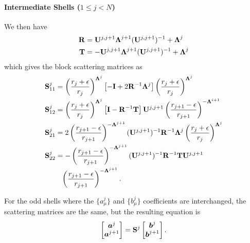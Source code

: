 \paragraph{Intermediate Shells  ($1\leq j < N$)}
We then have
  \begin{subequations}
  \begin{align}
   \mathbf{R}	&= \mathbf{U}^{j,j+1}\boldsymbol{\Lambda}^{j+1}(\mathbf{U}^{j,j+1})^{-1}+\boldsymbol{\Lambda}^j	\\
   \mathbf{T}	&= -\mathbf{U}^{j,j+1}\boldsymbol{\Lambda}^{j+1}(\mathbf{U}^{j,j+1})^{-1}+\boldsymbol{\Lambda}^j
  \end{align}
  \end{subequations}
which gives the block scattering matrices as
  \begin{subequations}
  \begin{align}
   \mathbf{S}^j_{11}	&= \left(\frac{r_j+\epsilon}{r_j}\right)^{\boldsymbol{\Lambda}^j}\left[-\mathbf{I}+2\mathbf{R}^{-1}\boldsymbol{\Lambda}^j\right]\left(\frac{r_j+\epsilon}{r_j}\right)^{\boldsymbol{\Lambda}^j}	\\
   \mathbf{S}^j_{12}	&= \left(\frac{r_j+\epsilon}{r_j}\right)^{\boldsymbol{\Lambda}^j}\left[\mathbf{I}-\mathbf{R}^{-1}\mathbf{T}\right]\mathbf{U}^{j,j+1}\left(\frac{r_{j+1}-\epsilon}{r_{j+1}}\right)^{-\boldsymbol{\Lambda}^{i+1}}	\\
   \mathbf{S}^j_{21}	&= 2\left(\frac{r_{j+1}-\epsilon}{r_{j+1}}\right)^{-\boldsymbol{\Lambda}^{j+1}}(\mathbf{U}^{j,j+1})^{-1}\mathbf{R}^{-1}\boldsymbol{\Lambda}^j\left(\frac{r_j+\epsilon}{r_j}\right)^{\boldsymbol{\Lambda}^j}	\\
   \mathbf{S}^j_{22}	&= -\left(\frac{r_{j+1}-\epsilon}{r_{j+1}}\right)^{-\boldsymbol{\Lambda}^{j+1}}(\mathbf{U}^{j,j+1})^{-1}\mathbf{R}^{-1}\mathbf{T}\mathbf{U}^{j,j+1}\nonumber\\
			&\phantom{=}\left(\frac{r_{j+1}-\epsilon}{r_{j+1}}\right)^{-\boldsymbol{\Lambda}^{j+1}}.
  \end{align}
  \end{subequations}

For the odd shells where the $\{a_\mu^j\}$ and $\{b_\mu^j\}$ coefficients are interchanged, 
the scattering matrices are the same, but the resulting equation is
  \begin{equation}
    \begin{bmatrix} \boldsymbol{a}^j \\ \boldsymbol{a}^{j+1} \end{bmatrix} = \mathbf{S}^j \begin{bmatrix} \boldsymbol{b}^j \\ \boldsymbol{b}^{j+1} \end{bmatrix}.
  \end{equation}

